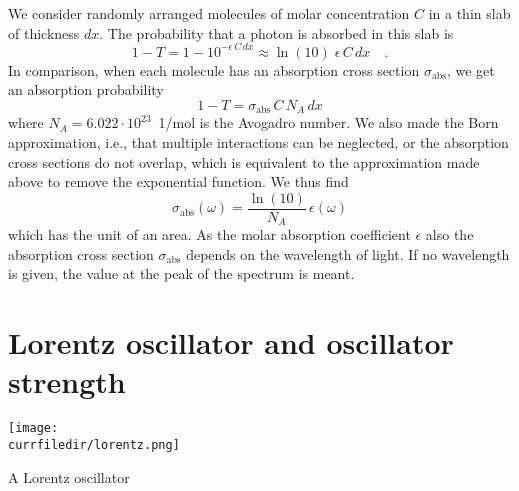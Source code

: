 We consider randomly arranged molecules of molar concentration $C$ in a thin slab of thickness $dx$. The probability that a photon is absorbed in this slab is
\begin{equation}
 1 - T =1 -  10^{- \epsilon\, C \, dx} \approx \ln (10) \; \epsilon\, C \, dx \quad .
\end{equation}
In comparison, when each molecule has an absorption cross section $\sigma_{\text{abs}}$, we get an absorption probability 
\begin{equation}
 1 - T = \sigma_{\text{abs}} \, C \, N_A \, dx
\end{equation}
where $N_A = 6.022 \cdot 10^{23}$~{1/mol} is the Avogadro number.  We also made the Born approximation, i.e., that multiple interactions can be neglected, or the absorption cross sections do not overlap, which is equivalent to the approximation made above to remove the exponential function.  We thus find
\begin{equation}
 \sigma_{\text{abs}}(\omega) =  \frac{\ln(10)}{ N_A } \, \epsilon(\omega)
\end{equation}
which has the unit of an area. As the  molar absorption coefficient $\epsilon$  also the absorption cross section $\sigma_{\text{abs}}$ depends on the wavelength of light. If no wavelength is given, the value at the peak of the spectrum is meant.


\section{Lorentz oscillator and oscillator strength}


\begin{marginfigure}
\texttt{[image: \\currfiledir/lorentz.png]}
\caption{A Lorentz oscillator}
\end{marginfigure}


